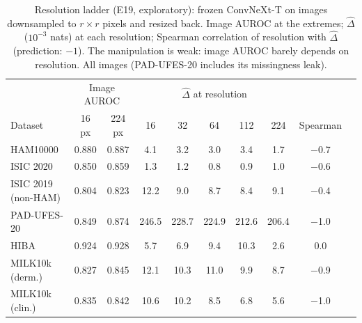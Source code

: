 \begin{table}[tp]\centering\footnotesize
\caption{Resolution ladder (E19, exploratory): frozen ConvNeXt-T on images downsampled to $r\times r$ pixels and resized back. Image AUROC at the extremes; $\hat\Delta$ ($10^{-3}$ nats) at each resolution; Spearman correlation of resolution with $\hat\Delta$ (prediction: $-1$). The manipulation is weak: image AUROC barely depends on resolution. All images (PAD-UFES-20 includes its missingness leak).}\label{tab:res}
\begin{tabular}{lccccccccc}\toprule
 & \multicolumn{2}{c}{Image AUROC} & \multicolumn{5}{c}{$\hat\Delta$ at resolution} & \\
Dataset & 16 px & 224 px & 16 & 32 & 64 & 112 & 224 & Spearman\\\midrule
HAM10000 & 0.880 & 0.887 & 4.1 & 3.2 & 3.0 & 3.4 & 1.7 & \ensuremath{-}0.7\\
ISIC 2020 & 0.850 & 0.859 & 1.3 & 1.2 & 0.8 & 0.9 & 1.0 & \ensuremath{-}0.6\\
ISIC 2019 (non-HAM) & 0.804 & 0.823 & 12.2 & 9.0 & 8.7 & 8.4 & 9.1 & \ensuremath{-}0.4\\
PAD-UFES-20 & 0.849 & 0.874 & 246.5 & 228.7 & 224.9 & 212.6 & 206.4 & \ensuremath{-}1.0\\
HIBA & 0.924 & 0.928 & 5.7 & 6.9 & 9.4 & 10.3 & 2.6 & 0.0\\
MILK10k (derm.) & 0.827 & 0.845 & 12.1 & 10.3 & 11.0 & 9.9 & 8.7 & \ensuremath{-}0.9\\
MILK10k (clin.) & 0.835 & 0.842 & 10.6 & 10.2 & 8.5 & 6.8 & 5.6 & \ensuremath{-}1.0\\
\bottomrule\end{tabular}\end{table}
